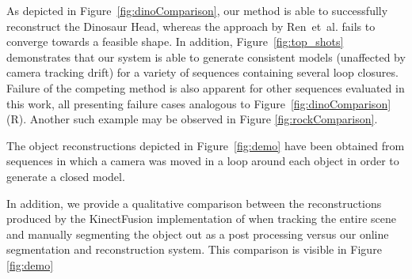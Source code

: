 As depicted in Figure~\ref{fig:dinoComparison}, our method is able to successfully reconstruct the Dinosaur Head, whereas the approach by Ren~et~al. fails to converge towards a feasible shape.
In addition, Figure~\ref{fig:top_shots} demonstrates that our system is able to generate consistent models (unaffected by camera tracking drift) for a variety of sequences containing several loop closures.
Failure of the competing method %
is also apparent for other sequences evaluated in this work, all presenting failure cases analogous to Figure~\ref{fig:dinoComparison}(R). %
Another such example may be observed in Figure \ref{fig:rockComparison}.

The object reconstructions depicted in Figure~\ref{fig:demo} have been obtained from sequences in which a camera was moved in a loop around each object in order to generate a closed model.

In addition, we provide a qualitative comparison between the reconstructions produced by the KinectFusion implementation of \cite{Prisacariu2014} when 
tracking the entire scene and manually segmenting the object out as a post processing versus our online segmentation and reconstruction system. This 
comparison is visible in Figure \ref{fig:demo}

